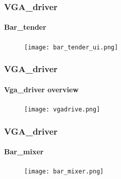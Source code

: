 \begin{frame}
  \frametitle{VGA\_driver}
  \framesubtitle{Bar\_tender}
  \begin{figure}[h]
    \centering 
    \texttt{[image: bar\_tender\_ui.png]} 
    \label{fig:vgadrive.png}
  \end{figure}
\end{frame}


\begin{frame}
  \frametitle{VGA\_driver}
  \framesubtitle{Vga\_driver overview}
  \begin{figure}[h]
    \centering 
    \texttt{[image: vgadrive.png]} 
    \label{fig:vgadrive.png}
  \end{figure}
\end{frame}


\begin{frame}
  \frametitle{VGA\_driver}
  \framesubtitle{Bar\_mixer}
  \begin{figure}[h]
    \centering 
    \texttt{[image: bar\_mixer.png]} 
    \label{fig:bar_mixer.png}
  \end{figure}
\end{frame}


